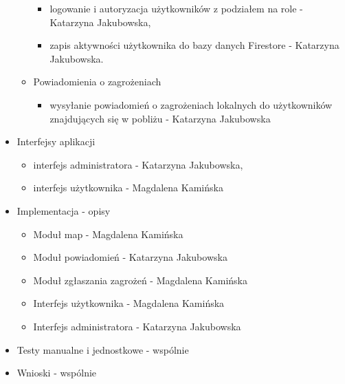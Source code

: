 \begin{itemize}
\begin{itemize}[label=$\circ$]
\begin{itemize}
                \item logowanie i autoryzacja użytkowników z podziałem na role - Katarzyna Jakubowska,
                \item zapis aktywności użytkownika do bazy danych Firestore - Katarzyna Jakubowska.
            \end{itemize}
            \item Powiadomienia o zagrożeniach
            \begin{itemize}
                \item wysyłanie powiadomień o zagrożeniach lokalnych do użytkowników znajdujących się w pobliżu - Katarzyna Jakubowska
            \end{itemize}
        \end{itemize}
        \item Interfejsy aplikacji
        \begin{itemize}[label=$\circ$]
            \item interfejs administratora - Katarzyna Jakubowska,
            \item interfejs użytkownika - Magdalena Kamińska
        \end{itemize}
        \item Implementacja - opisy
        \begin{itemize}
            \item Moduł map - Magdalena Kamińska
            \item Moduł powiadomień - Katarzyna Jakubowska
            \item Moduł zgłaszania zagrożeń - Magdalena Kamińska
            \item Interfejs użytkownika - Magdalena Kamińska
            \item Interfejs administratora - Katarzyna Jakubowska
        \end{itemize}
        \item Testy manualne i jednostkowe - wspólnie
        \item Wnioski - wspólnie
        \end{itemize}
   

    \newpage